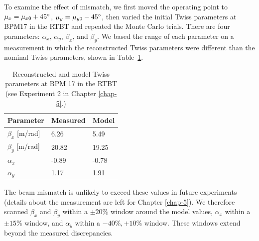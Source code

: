 To examine the effect of mismatch, we first moved the operating point to $\mu_x = \mu_{x0} + 45\degree$, $\mu_y = \mu_{y0} - 45\degree$, then varied the initial Twiss parameters at BPM17 in the RTBT and repeated the Monte Carlo trials. There are four parameters: $\alpha_x$, $\alpha_y$, $\beta_x$, and $\beta_y$. We based the range of each parameter on a measurement in which the reconstructed Twiss parameters were different than the nominal Twiss parameters, shown in Table~\ref{tab:mismatch}.  
%
\begin{table}[!p]
    \centering
    \caption{Reconstructed and model Twiss parameters at BPM 17 in the RTBT (see Experiment 2 in Chapter \ref{chap-5}.)}
    \begin{tabular}{lll}
    \midrule
    \textbf{Parameter} & \textbf{Measured} & \textbf{Model} \\
    \midrule
    $\beta_x$ [m/rad] & 6.26 & 5.49 \\
    $\beta_y$ [m/rad] & 20.82 & 19.25 \\
    $\alpha_x$ & -0.89 & -0.78 \\
    $\alpha_y$ & 1.17 & 1.91 \\
    \midrule    
    \end{tabular}
    \label{tab:mismatch}
\end{table}
%
The beam mismatch is unlikely to exceed these values in future experiments (details about the measurement are left for Chapter \ref{chap-5}). We therefore scanned $\beta_x$ and $\beta_y$ within a $\pm 20\%$ window around the model values, $\alpha_x$ within a $\pm 15\%$ window, and $\alpha_y$ within a $-40\%, +10\%$ window. These windows extend beyond the measured discrepancies.

